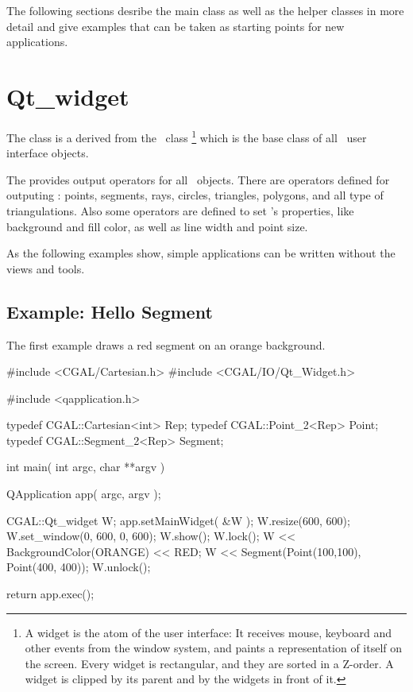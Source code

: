 The following sections desribe the main class as well as the helper classes
in more detail and give examples that can be taken as starting points for
new applications.


\section{Qt\_widget}
\label{Qt_widget}

The class  is a derived from the \qt\ class %
\footnote{A widget is the atom of the user interface: It receives mouse, keyboard and other 
events from the window system, and paints a representation of itself on the 
screen. Every widget is rectangular, and they are sorted in a Z-order. A 
widget is clipped by its parent and by the widgets in front of it.} 
which is the base class of all \qt\ user interface objects. 


The  provides output operators for all \cgal\ objects. There are 
operators defined for outputing : points, segments, rays, circles, triangles, 
polygons, and all type of triangulations. Also some operators are defined to 
set 's properties, like background and fill color, as well as line
width and point size.

As the following examples show, simple applications can be written
without the views and tools.

\subsection{Example: Hello Segment}

The first example draws a red segment on an orange background.

\begin{ccExampleCode}
#include <CGAL/Cartesian.h>
#include <CGAL/IO/Qt_Widget.h>

#include <qapplication.h>

typedef CGAL::Cartesian<int> Rep;
typedef CGAL::Point_2<Rep>   Point;
typedef CGAL::Segment_2<Rep> Segment;

int main( int argc, char **argv )
{
    QApplication app( argc, argv );

    CGAL::Qt_widget W;
    app.setMainWidget( &W );
    W.resize(600, 600);
    W.set_window(0, 600, 0, 600);
    W.show();
    W.lock();
    W << BackgroundColor(ORANGE) << RED;
    W << Segment(Point(100,100), Point(400, 400));
    W.unlock();

    return app.exec();
}
\end{ccExampleCode}

